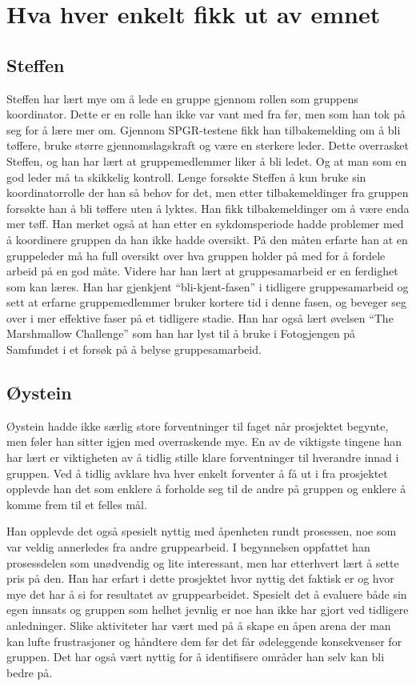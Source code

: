 \documentclass[a4paper,norsk,oneside]{article}
\begin{document}
\section{Hva hver enkelt fikk ut av emnet}

\subsection{Steffen}
Steffen har lært mye om å lede en gruppe gjennom rollen som gruppens koordinator. Dette er en rolle han ikke var vant med fra før, men som han tok på seg for å lære mer om. Gjennom SPGR-testene fikk han tilbakemelding om å bli tøffere, bruke større gjennomslagskraft og være en sterkere leder. Dette overrasket Steffen, og han har lært at gruppemedlemmer liker å bli ledet. Og at man som en god leder må ta skikkelig kontroll. Lenge forsøkte Steffen å kun bruke sin koordinatorrolle der han så behov for det, men etter tilbakemeldinger fra gruppen forsøkte han å bli tøffere uten å lyktes. Han fikk tilbakemeldinger om å være enda mer tøff. Han merket også at han etter en sykdomsperiode hadde problemer med å koordinere gruppen da han ikke hadde oversikt. På den måten erfarte han at en gruppeleder må ha full oversikt over hva gruppen holder på med for å fordele arbeid på en god måte.
Videre har han lært at gruppesamarbeid er en ferdighet som kan læres. Han har gjenkjent “bli-kjent-fasen” i tidligere gruppesamarbeid og sett at erfarne gruppemedlemmer bruker kortere tid i denne fasen, og beveger seg over i mer effektive faser på et tidligere stadie. Han har også lært øvelsen “The Marshmallow Challenge” som han har lyst til å bruke i Fotogjengen på Samfundet i et forsøk på å belyse gruppesamarbeid.

\subsection{Øystein} 
Øystein hadde ikke særlig store forventninger til faget når prosjektet begynte, men føler han sitter igjen med overraskende mye. En av de viktigste tingene han har lært er viktigheten av å tidlig stille klare forventninger til hverandre innad i gruppen. Ved å tidlig avklare hva hver enkelt forventer å få ut i fra prosjektet opplevde han det som enklere å forholde seg til de andre på gruppen og enklere å komme frem til et felles mål. 

Han opplevde det også spesielt nyttig med åpenheten rundt prosessen, noe som var veldig annerledes fra andre gruppearbeid. I begynnelsen oppfattet han prosessdelen som unødvendig og lite interessant, men har etterhvert lært å sette pris på den. Han har erfart i dette prosjektet hvor nyttig det faktisk er og hvor mye det har å si for resultatet av gruppearbeidet. Spesielt det å evaluere både sin egen innsats og gruppen som helhet jevnlig er noe han ikke har gjort ved tidligere anledninger. Slike aktiviteter har vært med på å skape en åpen arena der man kan lufte frustrasjoner og håndtere dem før det får ødeleggende konsekvenser for gruppen. Det har også vært nyttig for å identifisere områder han selv kan bli bedre på.
\end{document}
